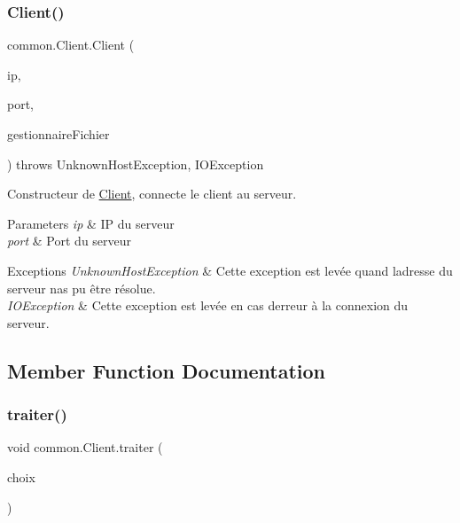 \subsubsection{\texorpdfstring{Client()}{Client()}}
{\footnotesize\ttfamily common.\+Client.\+Client (\begin{DoxyParamCaption}\item[{String}]{ip,  }\item[{int}]{port,  }\item[{\hyperlink{classcommon_1_1GestionnaireFichier}{Gestionnaire\+Fichier}}]{gestionnaire\+Fichier }\end{DoxyParamCaption}) throws Unknown\+Host\+Exception, I\+O\+Exception\hspace{0.3cm}{\ttfamily [inline]}}



Constructeur de \hyperlink{classcommon_1_1Client}{Client}, connecte le client au serveur. 


\begin{DoxyParams}{Parameters}
{\em ip} & IP du serveur \\
\hline
{\em port} & Port du serveur \\
\hline
\end{DoxyParams}

\begin{DoxyExceptions}{Exceptions}
{\em Unknown\+Host\+Exception} & Cette exception est levée quand l\textquotesingle{}adresse du serveur n\textquotesingle{}as pu être résolue. \\
\hline
{\em I\+O\+Exception} & Cette exception est levée en cas d\textquotesingle{}erreur à la connexion du serveur. \\
\hline
\end{DoxyExceptions}


\subsection{Member Function Documentation}
\mbox{\label{classcommon_1_1Client_aed8cc42e2cceb83b277c5776c8c314ec}} 
\subsubsection{\texorpdfstring{traiter()}{traiter()}}
{\footnotesize\ttfamily void common.\+Client.\+traiter (\begin{DoxyParamCaption}\item[{String}]{choix }\end{DoxyParamCaption})\hspace{0.3cm}{\ttfamily [inline]}}



